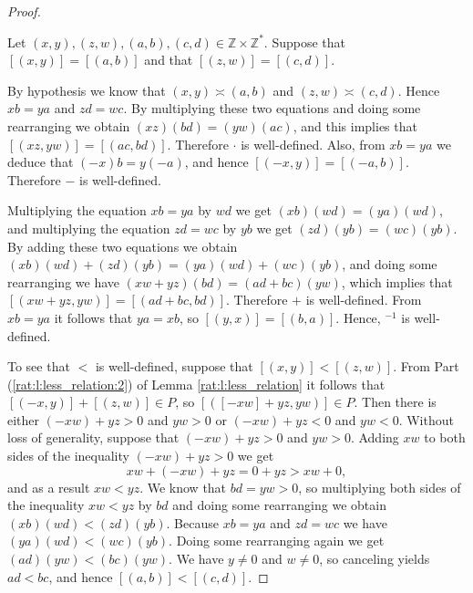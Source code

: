 \begin{proof}
	\begin{notmine}
		Let $(x, y), (z, w), (a, b), (c, d) \in \mathbb{Z} \times \mathbb{Z}^{*}$. Suppose that $[(x, y)] = [(a, b)]$ and that $[(z, w)] = [(c, d)]$.

		By hypothesis we know that $(x, y) \asymp (a, b)$ and $(z, w) \asymp (c, d)$. Hence $x b = y a$ and $z d = w c$. By multiplying these two equations and doing some rearranging we obtain $(x z)(b d) = (y w)(a c)$, and this implies that $[(x z, y w)] = [(a c, b d)]$. Therefore $\cdot$ is well-defined. Also, from $x b = y a$ we deduce that $(-x)b = y(-a)$, and hence $[(-x, y)] = [(-a, b)]$. Therefore $-$ is well-defined.
	\end{notmine}

	Multiplying the equation $x b = y a$ by $w d$ we get $(x b)(w d) = (y a)(w d)$, and multiplying the equation $z d = w c$ by $y b$ we get $(z d)(y b) = (w c)(y b)$. By adding these two equations we obtain $(x b)(w d) + (z d)(y b) = (y a)(w d) + (w c)(y b)$, and doing some rearranging we have $(x w + y z)(b d) = (a d + b c)(y w)$, which implies that $[(x w + yz, y w)] = [(a d + b c, b d)]$. Therefore $+$ is well-defined. From $x b = y a$ it follows that $y a = x b$, so $[(y, x)] = [(b, a)]$. Hence, $^{-1}$ is well-defined.

	To see that $<$ is well-defined, suppose that $[(x, y)] < [(z, w)]$. From Part (\ref{rat:l:less_relation:2}) of Lemma \ref{rat:l:less_relation} it follows that $[(-x, y)] + [(z, w)] \in P$, so $[([-x w] + y z, y w)] \in P$. Then there is either $(-x w) + y z > 0$ and $y w > 0$ or $(-x w) + y z < 0$ and $y w < 0$. Without loss of generality, suppose that $(-x w) + y z > 0$ and $y w > 0$. Adding $x w$ to both sides of the inequality $(-x w) + y z > 0$ we get
	\[
		x w + (-x w) + y z = 0 + y z > x w + 0,
	\]
	and as a result ${x w < y z}$. We know that $b d = y w > 0$, so multiplying both sides of the inequality ${x w < y z}$ by $b d$ and doing some rearranging we obtain ${(x b)(w d) < (z d)(y b)}$. Because $x b = y a$ and $z d = w c$ we have ${(y a)(w d) < (w c)(y b)}$. Doing some rearranging again we get $(a d)(y w) < (b c)(y w)$. We have $y \not= 0$ and $w \not= 0$, so canceling yields $a d < b c$, and hence $[(a, b)] < [(c, d)]$.
\end{proof}


\Newpage
\ratLessRelL*

